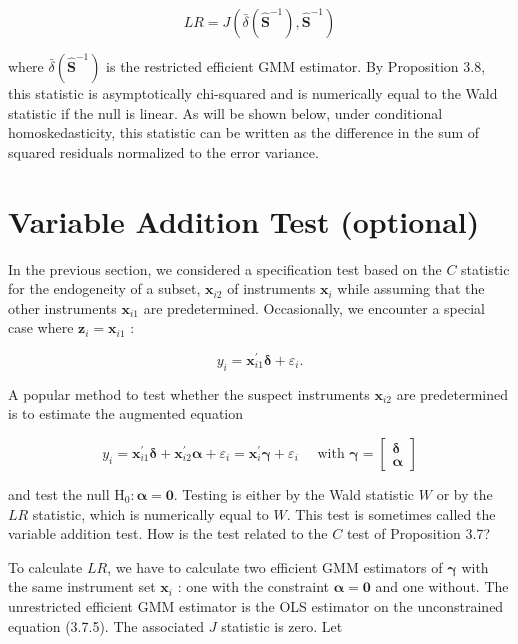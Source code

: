 \documentclass[10pt]{article}
\begin{document}
\begin{equation*}
L R=J\left(\bar{\delta}\left(\widehat{\mathbf{S}}^{-1}\right), \widehat{\mathbf{S}}^{-1}\right) \tag{3.7.3}
\end{equation*}


where $\bar{\delta}\left(\widehat{\mathbf{S}}^{-1}\right)$ is the restricted efficient GMM estimator. By Proposition 3.8, this statistic is asymptotically chi-squared and is numerically equal to the Wald statistic if the null is linear. As will be shown below, under conditional homoskedasticity, this statistic can be written as the difference in the sum of squared residuals normalized to the error variance.

\section*{Variable Addition Test (optional)}
In the previous section, we considered a specification test based on the $C$ statistic for the endogeneity of a subset, $\mathbf{x}_{i 2}$ of instruments $\mathbf{x}_{i}$ while assuming that the other instruments $\mathbf{x}_{i 1}$ are predetermined. Occasionally, we encounter a special case where $\mathbf{z}_{i}=\mathbf{x}_{i 1}$ :


\begin{equation*}
y_{i}=\mathbf{x}_{i 1}^{\prime} \boldsymbol{\delta}+\varepsilon_{i} . \tag{3.7.4}
\end{equation*}


A popular method to test whether the suspect instruments $\mathbf{x}_{i 2}$ are predetermined is to estimate the augmented equation

\[
y_{i}=\mathbf{x}_{i 1}^{\prime} \boldsymbol{\delta}+\mathbf{x}_{i 2}^{\prime} \boldsymbol{\alpha}+\varepsilon_{i}=\mathbf{x}_{i}^{\prime} \boldsymbol{\gamma}+\varepsilon_{i} \quad \text { with } \boldsymbol{\gamma}=\left[\begin{array}{l}
\boldsymbol{\delta}  \tag{3.7.5}\\
\boldsymbol{\alpha}
\end{array}\right]
\]

and test the null $\mathrm{H}_{0}: \boldsymbol{\alpha}=\mathbf{0}$. Testing is either by the Wald statistic $W$ or by the $L R$ statistic, which is numerically equal to $W$. This test is sometimes called the variable addition test. How is the test related to the $C$ test of Proposition 3.7?

To calculate $L R$, we have to calculate two efficient GMM estimators of $\boldsymbol{\gamma}$ with the same instrument set $\mathbf{x}_{i}$ : one with the constraint $\boldsymbol{\alpha}=\mathbf{0}$ and one without. The unrestricted efficient GMM estimator is the OLS estimator on the unconstrained equation (3.7.5). The associated $J$ statistic is zero. Let
\end{document}
